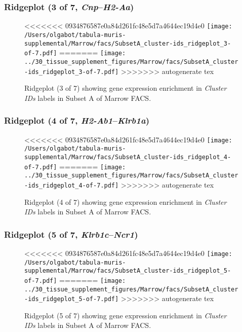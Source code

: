 \clearpage

\subsubsection{Ridgeplot (3 of 7, \emph{Cnp}--\emph{H2-Aa})}
\begin{figure}[h]
\centering
<<<<<<< 0934876587e0a84d261fc48e5d7a4644ec19d4e0
\texttt{[image: /Users/olgabot/tabula-muris-supplemental/Marrow/facs/SubsetA\_cluster-ids\_ridgeplot\_3-of-7.pdf]}
=======
\texttt{[image: ../30\_tissue\_supplement\_figures/Marrow/facs/SubsetA\_cluster-ids\_ridgeplot\_3-of-7.pdf]}
>>>>>>> autogenerate tex

\caption{ Ridgeplot (3 of 7)  showing gene expression enrichment in \emph{Cluster IDs} labels in Subset A of Marrow FACS. }
\end{figure}


\clearpage

\subsubsection{Ridgeplot (4 of 7, \emph{H2-Ab1}--\emph{Klrb1a})}
\begin{figure}[h]
\centering
<<<<<<< 0934876587e0a84d261fc48e5d7a4644ec19d4e0
\texttt{[image: /Users/olgabot/tabula-muris-supplemental/Marrow/facs/SubsetA\_cluster-ids\_ridgeplot\_4-of-7.pdf]}
=======
\texttt{[image: ../30\_tissue\_supplement\_figures/Marrow/facs/SubsetA\_cluster-ids\_ridgeplot\_4-of-7.pdf]}
>>>>>>> autogenerate tex

\caption{ Ridgeplot (4 of 7)  showing gene expression enrichment in \emph{Cluster IDs} labels in Subset A of Marrow FACS. }
\end{figure}


\clearpage

\subsubsection{Ridgeplot (5 of 7, \emph{Klrb1c}--\emph{Ncr1})}
\begin{figure}[h]
\centering
<<<<<<< 0934876587e0a84d261fc48e5d7a4644ec19d4e0
\texttt{[image: /Users/olgabot/tabula-muris-supplemental/Marrow/facs/SubsetA\_cluster-ids\_ridgeplot\_5-of-7.pdf]}
=======
\texttt{[image: ../30\_tissue\_supplement\_figures/Marrow/facs/SubsetA\_cluster-ids\_ridgeplot\_5-of-7.pdf]}
>>>>>>> autogenerate tex

\caption{ Ridgeplot (5 of 7)  showing gene expression enrichment in \emph{Cluster IDs} labels in Subset A of Marrow FACS. }
\end{figure}


